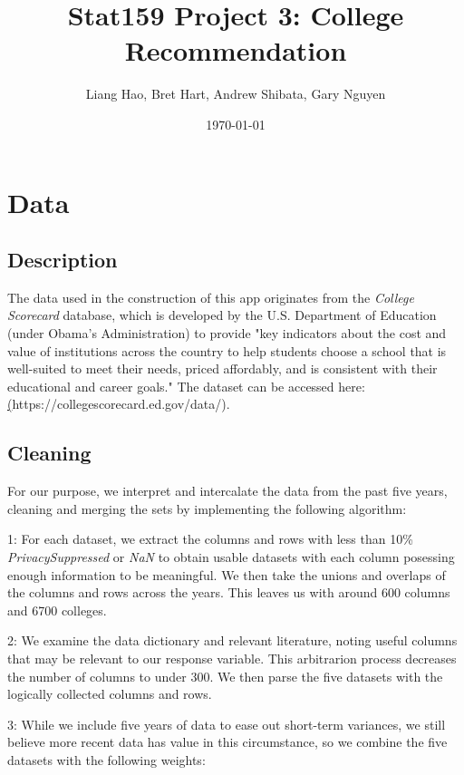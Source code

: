 \documentclass{article}\usepackage[]{graphicx}\usepackage[]{color}
\title{Stat159 Project 3: College Recommendation}
\author{Liang Hao, Bret Hart, Andrew Shibata, Gary Nguyen}
\date{\today}
\begin{document}
\maketitle
\section{Data}



\subsection{Description}

The data used in the construction of this app originates from the \emph{College Scorecard} database, which is developed by the U.S. Department of Education (under Obama's Administration) to provide "key indicators about the cost and value of institutions across the country to help students choose a school that is well-suited to meet their needs, priced affordably, and is consistent with their educational and career goals." The dataset can be accessed here: \href{https://collegescorecard.ed.gov/data/}(https://collegescorecard.ed.gov/data/).

\subsection{Cleaning}
For our purpose, we interpret and intercalate the data from the past five years, cleaning and merging the sets by implementing the following algorithm:\newline

1: For each dataset, we extract the columns and rows with less than 10\% \emph{PrivacySuppressed} or \emph{NaN} to obtain usable datasets with each column posessing enough information to be meaningful. We then take the unions and overlaps of the columns and rows across the years. This leaves us with around 600 columns and 6700 colleges.\newline


2: We examine the data dictionary and relevant literature, noting useful columns that may be relevant to our response variable. This arbitrarion process decreases the number of columns to under 300. We then parse the five datasets with the logically collected columns and rows.\newline

3: While we include five years of data to ease out short-term variances, we still believe more recent data has value in this circumstance, so we combine the five datasets with the following weights:
\end{document}
